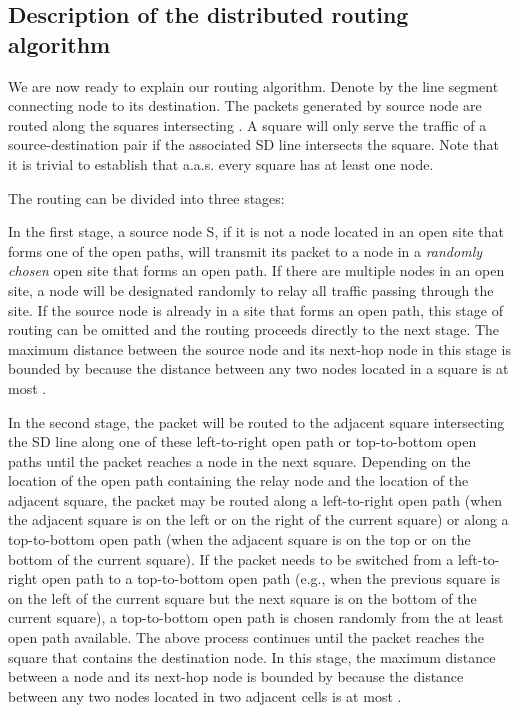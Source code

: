 \documentclass[english]{IEEEtran}
\theoremstyle{plain}
\theoremstyle{plain}
\theoremstyle{plain}
\theoremstyle{remark}
\begin{document}
\subsection{Description of the distributed routing algorithm}

We are now ready to explain our routing algorithm. Denote by 
the line segment connecting node  to its destination. The packets
generated by source node  are routed along the squares intersecting
. A square will only serve the traffic of a source-destination
pair if the associated SD line intersects the square. Note that it
is trivial to establish that a.a.s. every square has at least one
node. 

The routing can be divided into three stages:

In the first stage, a source node S, if it is not a node located in
an open site that forms one of the open paths, will transmit its packet
to a node in a \emph{randomly chosen} open site that forms an open
path. If there are multiple nodes in an open site, a node will be
designated randomly to relay all traffic passing through the site.
If the source node is already in a site that forms an open path, this
stage of routing can be omitted and the routing proceeds directly
to the next stage. The maximum distance between the source node and
its next-hop node in this stage is bounded by 
because the distance between any two nodes located in a square is
at most . 

In the second stage, the packet will be routed to the adjacent square
intersecting the SD line along one of these left-to-right open path
or top-to-bottom open paths until the packet reaches a node in the
next square. Depending on the location of the open path containing
the relay node and the location of the adjacent square, the packet
may be routed along a left-to-right open path (when the adjacent square
is on the left or on the right of the current square) or along a top-to-bottom
open path (when the adjacent square is on the top or on the bottom
of the current square). If the packet needs to be switched from a
left-to-right open path to a top-to-bottom open path (e.g., when the
previous square is on the left of the current square but the next
square is on the bottom of the current square), a top-to-bottom open
path is chosen randomly from the at least  open
path available. The above process continues until the packet reaches
the square that contains the destination node. In this stage, the
maximum distance between a node and its next-hop node is bounded by
 because the distance between any two nodes located in
two adjacent cells is at most . 
\end{document}
